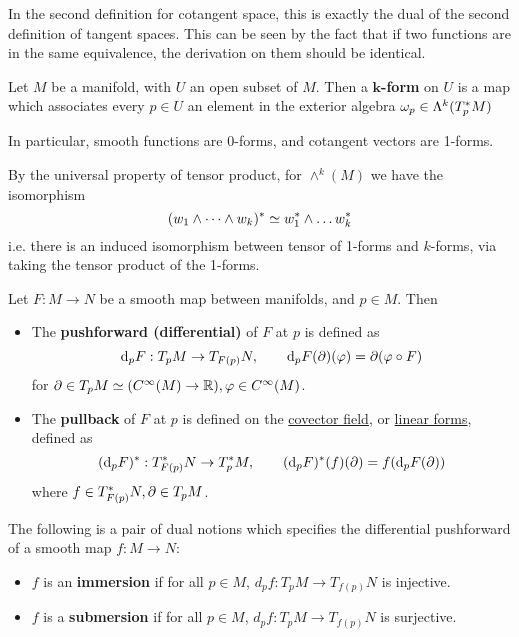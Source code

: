 \documentclass{article}
\begin{document}
\begin{remark}
    In the second definition for cotangent space, this is exactly the dual of the second definition of tangent spaces. This can be seen by the fact that if two functions are in the same equivalence, the derivation on them should be identical.
\end{remark}

\begin{definition}
    Let $M$ be a manifold, with $U$ an open subset of $M$. Then a \textbf{$\bm{k}$-form} on $U$ is a map which associates every $p \in U$ an element in the exterior algebra $\omega_p \in \Lambda^k(T_p^{\ast} M)$
\end{definition}

\begin{remark}
    In particular, smooth functions are 0-forms, and cotangent vectors are 1-forms.
\end{remark}

\begin{remark}
    By the universal property of tensor product, for $\wedge^k(M)$ we have the isomorphism
    \[
        (w_1 \wedge \dots \wedge w_k)^{\ast} \simeq w_1^{\ast} \wedge \dots w_k^{\ast}
    \]
    i.e. there is an induced isomorphism between tensor of 1-forms and $k$-forms, via taking the tensor product of the 1-forms.
\end{remark}

\begin{definition}
    Let $F: M \to N$ be a smooth map between manifolds, and $p \in M$. Then
    \begin{itemize}
        \item The \textbf{pushforward (differential)} of $F$ at $p$ is defined as
        \[
            \mathrm{d}_p F: T_p M \to T_{F(p)} N, \qquad \mathrm{d}_p F (\partial) (\varphi) = \partial(\varphi \circ F)
        \]
        for $\partial \in T_p M \simeq (C^{\infty}(M) \to \mathbb{R}), \varphi \in C^{\infty}(M)$.
        \item The \textbf{pullback} of $F$ at $p$ is defined on the \underline{covector field}, or \underline{linear forms}, defined as 
        \[
            (\mathrm{d}_p F)^{\ast}: T_{F(p)}^{\ast}N \to T_p^{\ast} M, \qquad (\mathrm{d}_p F)^{\ast}(f)(\partial) = f(\mathrm{d}_p F(\partial))
        \]
        where $f \in T_{F(p)}^{\ast} N, \partial \in T_p M$.
    \end{itemize}
\end{definition}

\begin{definition}
    The following is a pair of dual notions which specifies the differential pushforward of a smooth map $f: M \to N$:
    \begin{itemize}
        \item $f$ is an \textbf{immersion} if for all $p \in M$, $d_p f : T_p  M \to T_{f          (p)} N$ is injective.
        \item $f$ is a \textbf{submersion} if for all $p \in M$, $d_p f : T_p  M \to T_{f(p)} N$ is surjective.
    \end{itemize}
\end{definition}
\end{document}
